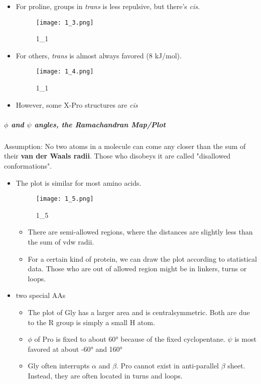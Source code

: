 \begin{itemize}
	\item
	For proline, groups in \emph{trans} is less repulsive, but there's
	\emph{cis}.
	
	\begin{figure}
		\centering
		\texttt{[image: 1\_3.png]}
		\caption{1\_1}
	\end{figure}
	\item
	For others, \emph{trans} is almost always favored (8 kJ/mol).
	
	\begin{figure}
		\centering
		\texttt{[image: 1\_4.png]}
		\caption{1\_1}
	\end{figure}
	\item
	However, some X-Pro structures are \emph{cis}
\end{itemize}

\hypertarget{and--angles-the-ramachandran-mapplot}{%
	\subparagraph{\texorpdfstring{\(\phi\) and \(\psi\) angles, the
			Ramachandran
			Map/Plot}{\textbackslash{}phi and \textbackslash{}psi angles, the Ramachandran Map/Plot}}\label{and--angles-the-ramachandran-mapplot}}

Assumption: No two atoms in a molecule can come any closer than the sum
of their \textbf{van der Waals radii}. Those who disobeys it are called
"disallowed conformations".

\begin{itemize}
	\item
	The plot is similar for most amino acids.
	
	\begin{figure}
		\centering
		\texttt{[image: 1\_5.png]}
		\caption{1\_5}
	\end{figure}
	
	\begin{itemize}
		\item
		There are semi-allowed regions, where the distances are slightly
		less than the sum of vdw radii. 
		\item
		For a certain kind of protein, we can draw the plot according to
		statistical data. Those who are out of allowed region might be in
		linkers, turns or loops.
	\end{itemize}
	\item
	two special AAs
	
	\begin{itemize}
		\item
		The plot of Gly has a larger area and is centralsymmetric. Both are
		due to the R group is simply a small H atom.
		\item
		\(\phi\) of Pro is fixed to about 60° because of the fixed
		cyclopentane. \(\psi\) is most favored at about -60° and 160°
		\item
		Gly often interrupts \(\alpha\) and \(\beta\). Pro cannot exist in
		anti-parallel \(\beta\) sheet. Instead, they are often located in
		turns and loops.
	\end{itemize}
\end{itemize}

